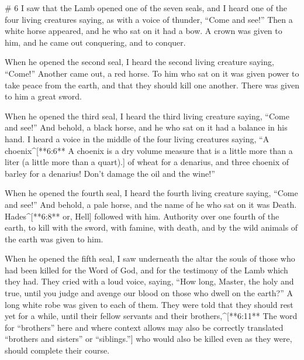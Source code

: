 \begin{paracols}{2}
\switchcolumn
\begin{english}

# 6
 I saw that the Lamb opened one of the seven seals, and I heard one of the four living creatures saying, as with a voice of thunder, “Come and see!”  Then a white horse appeared, and he who sat on it had a bow. A crown was given to him, and he came out conquering, and to conquer. 

 When he opened the second seal, I heard the second living creature saying, “Come!”  Another came out, a red horse. To him who sat on it was given power to take peace from the earth, and that they should kill one another. There was given to him a great sword. 

 When he opened the third seal, I heard the third living creature saying, “Come and see!” And behold, a black horse, and he who sat on it had a balance in his hand.  I heard a voice in the middle of the four living creatures saying, “A choenix^[**6:6** A choenix is a dry volume measure that is a little more than a liter (a little more than a quart).] of wheat for a denarius, and three choenix of barley for a denarius! Don’t damage the oil and the wine!” 

 When he opened the fourth seal, I heard the fourth living creature saying, “Come and see!”  And behold, a pale horse, and the name of he who sat on it was Death. Hades^[**6:8** or, Hell] followed with him. Authority over one fourth of the earth, to kill with the sword, with famine, with death, and by the wild animals of the earth was given to him. 

 When he opened the fifth seal, I saw underneath the altar the souls of those who had been killed for the Word of God, and for the testimony of the Lamb which they had.  They cried with a loud voice, saying, “How long, Master, the holy and true, until you judge and avenge our blood on those who dwell on the earth?”  A long white robe was given to each of them. They were told that they should rest yet for a while, until their fellow servants and their brothers,^[**6:11** The word for “brothers” here and where context allows may also be correctly translated “brothers and sisters” or “siblings.”] who would also be killed even as they were, should complete their course. 


\end{english}
\end{paracols}
